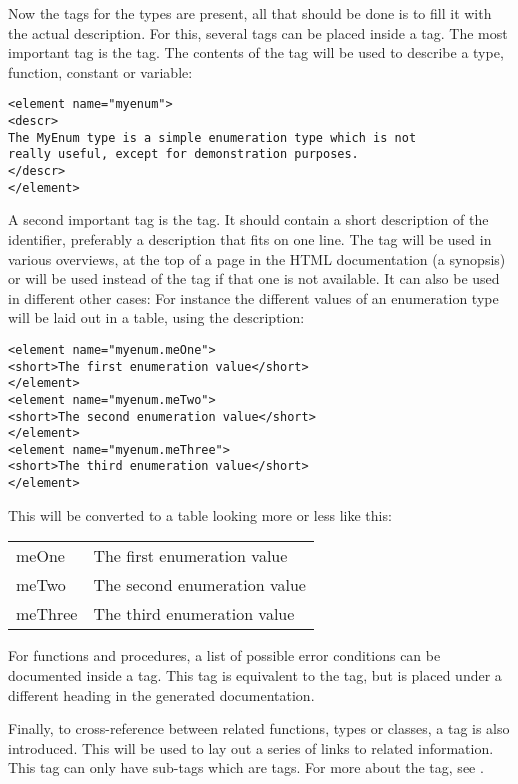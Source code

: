 Now the tags for the types are present, all that should be done is to fill
it with the actual description.  For this, several tags can be placed inside
a  tag. The most important tag is the  tag. The
contents of the  tag will be used to describe a type, function, 
constant or variable:

\begin{verbatim}
<element name="myenum">
<descr>
The MyEnum type is a simple enumeration type which is not
really useful, except for demonstration purposes.
</descr>
</element>
\end{verbatim}

A second important tag is the  tag. It should contain a 
short description of the identifier, preferably a description that fits on
one line. The  tag will be used in
various overviews, at the top of a page in the HTML documentation (a
synopsis) or will be used instead of the  tag if that one 
is not available. It can also be used in different other cases: For 
instance the different values of an enumeration type will be laid 
out in a table, using the  description:
\begin{verbatim}
<element name="myenum.meOne">
<short>The first enumeration value</short>
</element>
<element name="myenum.meTwo">
<short>The second enumeration value</short>
</element>
<element name="myenum.meThree">
<short>The third enumeration value</short>
</element>
\end{verbatim}
This will be converted to a table looking more or less like this:

\begin{tabularx}{\textwidth}{lX}
meOne & The first enumeration value \\
meTwo & The second enumeration value \\
meThree & The third enumeration value \\
\end{tabularx}

For functions and procedures, a list of possible error conditions can be
documented inside a  tag. This tag is equivalent to the
 tag, but is placed under a different heading in the generated
documentation.

Finally, to cross-reference between related functions, types or classes, a
 tag is also introduced. This will be used to lay out a series
of links to related information. This tag can only have sub-tags which are
 tags. For more about the  tag, see .

